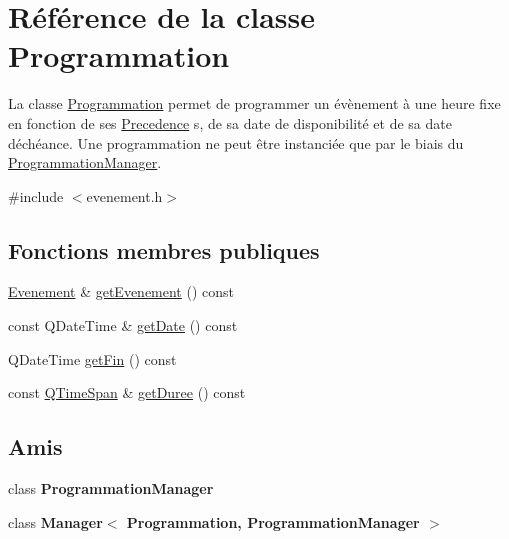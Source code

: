 \hypertarget{class_programmation}{}\section{Référence de la classe Programmation}
\label{class_programmation}


La classe \hyperlink{class_programmation}{Programmation} permet de programmer un évènement à une heure fixe en fonction de ses \hyperlink{class_precedence}{Precedence} s, de sa date de disponibilité et de sa date d\textquotesingle{}échéance. Une programmation ne peut être instanciée que par le biais du \hyperlink{class_programmation_manager}{Programmation\+Manager}.  




{\ttfamily \#include $<$evenement.\+h$>$}

\subsection*{Fonctions membres publiques}
\begin{DoxyCompactItemize}
\item 
\hyperlink{class_evenement}{Evenement} \& \hyperlink{class_programmation_a574f0e84ee4de3937249dff5df428d9a}{get\+Evenement} () const 
\item 
const Q\+Date\+Time \& \hyperlink{class_programmation_af047996948783353b99d55e2cd3dfd67}{get\+Date} () const 
\item 
Q\+Date\+Time \hyperlink{class_programmation_a178ae2552313a68a3552dea0782d042e}{get\+Fin} () const 
\item 
const \hyperlink{class_q_time_span}{Q\+Time\+Span} \& \hyperlink{class_programmation_a45fae841a66ff8abc7bd0af0d913f99f}{get\+Duree} () const 
\end{DoxyCompactItemize}
\subsection*{Amis}
\begin{DoxyCompactItemize}
\item 
\hypertarget{class_programmation_ade7bfcbf8cec66b12064c8ff25993d73}{}class {\bfseries Programmation\+Manager}\label{class_programmation_ade7bfcbf8cec66b12064c8ff25993d73}

\item 
\hypertarget{class_programmation_a2addbb7d8b656f2ebe9ca6edbb551f64}{}class {\bfseries Manager$<$ Programmation, Programmation\+Manager $>$}\label{class_programmation_a2addbb7d8b656f2ebe9ca6edbb551f64}

\end{DoxyCompactItemize}


